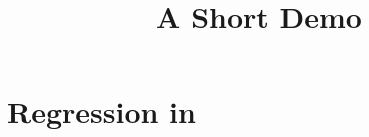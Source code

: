 \documentclass[article]{jss}
\title{A Short Demo}
\begin{document}
\section[Regression in R]{Regression in }
\end{document}
